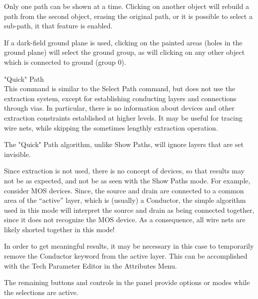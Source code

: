 \begin{description}
Only one path can be shown at a time.  Clicking on another object will
rebuild a path from the second object, erasing the original path, or
it is possible to select a sub-path, it that feature is enabled.

If a dark-field ground plane is used, clicking on the painted areas
(holes in the ground plane) will select the ground group, as will
clicking on any other object which is connected to ground (group 0).

\item{\cb "Quick" Path}\\
This command is similar to the {\cb Select Path} command, but does not
use the extraction system, except for establishing conducting layers
and connections through vias.  In particular, there is no information
about devices and other extraction constraints established at higher
levels.  It may be useful for tracing wire nets, while skipping the
sometimes lengthly extraction operation.

The {\cb "Quick" Path} algorithm, unlike {\cb Show Paths}, will ignore
layers that are set invisible.

Since extraction is not used, there is no concept of devices, so that
results may not be as expected, and not be as seen with the {\cb Show
Paths} mode.  For example, consider MOS devices.  Since, the source
and drain are connected to a common area of the ``active'' layer,
which is (usually) a {\vt Conductor}, the simple algorithm used in
this mode will interpret the source and drain as being connected
together, since it does not recognize the MOS device.  As a
consequence, all wire nets are likely shorted together in this mode!

In order to get meaningful results, it may be necessary in this case
to temporarily remove the {\vt Conductor} keyword from the active
layer.  This can be accomplished with the {\cb Tech Parameter Editor}
in the {\cb Attributes Menu}.
\end{description}

The remaining buttons and controls in the panel provide options or
modes while the selections are active.

